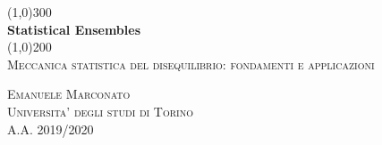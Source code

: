 \documentclass{article}
\begin{document}
\begin{titlepage}
	\begin{center}
	
	\line(1,0){300}\\
	[5mm]
	\huge{\bfseries Statistical Ensembles}\\
	[2mm]
	\line(1,0){200}\\
	[2cm]
	\textsc{\Large Meccanica statistica del disequilibrio: fondamenti e applicazioni} \\
	[8cm]
	
	\end{center}
	
	\begin{flushright}
	\textsc{\LARGE Emanuele Marconato}\\
	[0.5cm]
	\textsc{\large Universita' degli studi di Torino\\
	[0.5cm]
	A.A. 2019/2020 }
	\end{flushright}
	
\end{titlepage}
\end{document}
